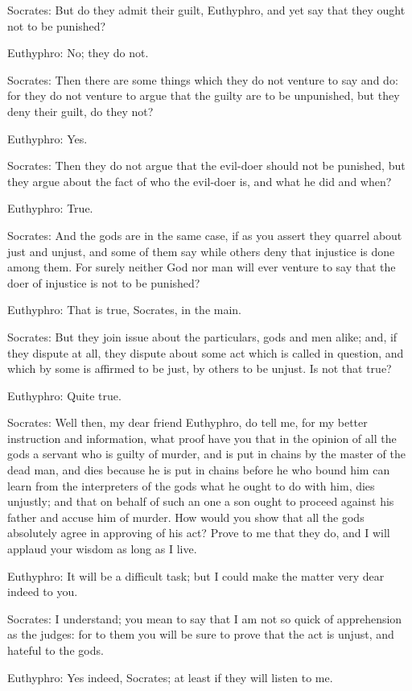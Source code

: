 Socrates: But do they admit their guilt, Euthyphro, and yet say that they ought not to be punished?

Euthyphro: No; they do not.

Socrates: Then there are some things which they do not venture to say and do: for they do not venture to argue that the guilty are to be unpunished, but they deny their guilt, do they not?

Euthyphro: Yes.

Socrates: Then they do not argue that the evil-doer should not be punished, but they argue about the fact of who the evil-doer is, and what he did and when?

Euthyphro: True.

Socrates: And the gods are in the same case, if as you assert they quarrel about just and unjust, and some of them say while others deny that injustice is done among them. For surely neither God nor man will ever venture to say that the doer of injustice is not to be punished?

Euthyphro: That is true, Socrates, in the main.

Socrates: But they join issue about the particulars, gods and men alike; and, if they dispute at all, they dispute about some act which is called in question, and which by some is affirmed to be just, by others to be unjust. Is not that true?

Euthyphro: Quite true.

Socrates: Well then, my dear friend Euthyphro, do tell me, for my better instruction and information, what proof have you that in the opinion of all the gods a servant who is guilty of murder, and is put in chains by the master of the dead man, and dies because he is put in chains before he who bound him can learn from the interpreters of the gods what he ought to do with him, dies unjustly; and that on behalf of such an one a son ought to proceed against his father and accuse him of murder. How would you show that all the gods absolutely agree in approving of his act? Prove to me that they do, and I will applaud your wisdom as long as I live.

Euthyphro: It will be a difficult task; but I could make the matter very dear indeed to you.

Socrates: I understand; you mean to say that I am not so quick of apprehension as the judges: for to them you will be sure to prove that the act is unjust, and hateful to the gods.

Euthyphro: Yes indeed, Socrates; at least if they will listen to me.

